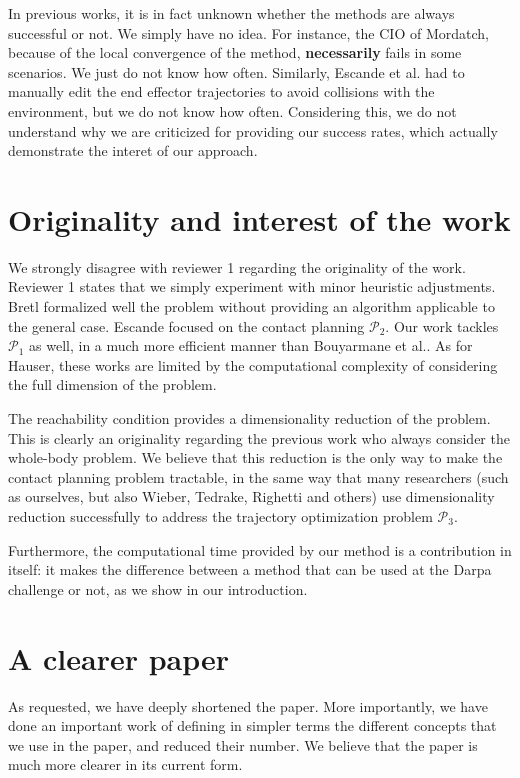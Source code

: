 \documentclass[12pt]{article}
\begin{document}
In previous works, it is in fact unknown whether the methods are always successful or not. We simply have no idea. For instance, the CIO of Mordatch,
because of the local convergence of the method, \textbf{necessarily} fails in some scenarios. We just do not know how often. Similarly, Escande et al. had to manually edit 
the end effector trajectories to avoid collisions with the environment, but we do not know how often. Considering this,
we do not understand why we are criticized for providing our success rates, which actually demonstrate the interet of our approach.

\section{Originality and interest of the work}
We strongly disagree with reviewer 1 regarding the originality of the work. Reviewer 1 states that we simply experiment with minor heuristic adjustments.
Bretl formalized well the problem without providing an algorithm applicable to the general case. Escande focused on the contact planning $\mathcal{P}_2$. 
Our work tackles $\mathcal{P}_1$ as well, in a much more efficient manner than Bouyarmane et al.. 
As for Hauser, these works are limited by the computational complexity of considering the full dimension of the problem.


The reachability condition provides a dimensionality reduction of the problem. This is clearly an originality regarding the previous work who always consider the whole-body problem.
We believe that this reduction is the only way to make the contact planning problem tractable, in the same way that many researchers (such as ourselves, but also Wieber, Tedrake, Righetti and others) use dimensionality reduction successfully to address
the trajectory optimization problem $\mathcal{P}_3$.

Furthermore, the computational time provided by our method is a contribution in itself: it makes the difference
between a method that can be used at the Darpa challenge or not, as we show in our introduction.

\section{A clearer paper}
As requested, we have deeply shortened the paper. More importantly, we have done an important work of defining in simpler terms
the different concepts that we use in the paper, and reduced their number.
We believe that the paper is much more clearer in its current form.
\end{document}
